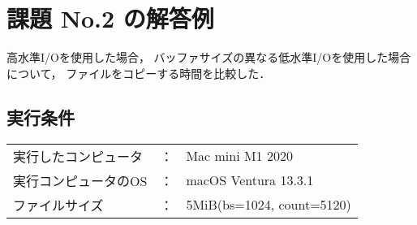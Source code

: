 \documentclass[a4j,twcolumn,11pt,nomag]{ltjarticle}      %
\begin{document}
\onecolumn
\section*{課題 No.2 の解答例}

高水準I/Oを使用した場合，
バッファサイズの異なる低水準I/Oを使用した場合について，
ファイルをコピーする時間を比較した．

\subsection*{実行条件}
  \begin{center}
    \begin{tabular}{l c l}
      実行したコンピュータ & ： & Mac mini M1 2020 \\
      実行コンピュータのOS & ： & macOS Ventura 13.3.1 \\
      ファイルサイズ      & ： & 5MiB(bs=1024, count=5120) \\
    \end{tabular}  
  \end{center}  
\end{document}
